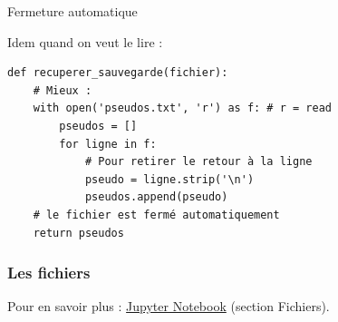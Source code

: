 \documentclass[x11names,svgnames]{beamer}
\begin{document}
\begin{frame}[fragile]{Fermeture automatique}

Idem quand on veut le lire :

  \begin{mdframed}[roundcorner=5pt]
\begin{verbatim}
def recuperer_sauvegarde(fichier):
    # Mieux :
    with open('pseudos.txt', 'r') as f: # r = read
        pseudos = []
        for ligne in f:
            # Pour retirer le retour à la ligne
            pseudo = ligne.strip('\n')
            pseudos.append(pseudo)
    # le fichier est fermé automatiquement
    return pseudos
\end{verbatim}
  \end{mdframed}
\end{frame}

\begin{frame}[fragile]
  \frametitle{Les fichiers}

  Pour en savoir plus : \href{https://mybinder.org/v2/gh/UGE-IGM/amphis-AP1/main?labpath=2023-2024%2F6-iterables%2F6-iterables.ipynb}{Jupyter Notebook} (section \og Fichiers\fg).
  
\end{frame}
\end{document}
